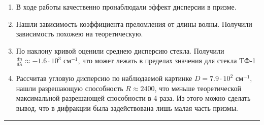 \documentclass[a4paper,12pt]{article} %
\begin{document}
\begin{enumerate}
\item В ходе работы	 качественно пронаблюдали эффект дисперсии в призме.
\item Нашли зависимость коэффициента преломления от длины волны. Получили зависимость похожею на теоретическую. 
\item По наклону кривой оценили среднею дисперсию стекла. Получили $\frac{dn}{d\lambda} \approx -1.6 \cdot 10^{3}$ см$^{-1}$, что может лежать в пределах значения для стекла TФ-1
\item Рассчитав угловую дисперсию по наблюдаемой картинке $D = 7.9 \cdot 10^2 $ см$^{-1}$, нашли разрешающую способность $R \approx 2400$, что меньше теоретической максимальной разрешающей способности в 4 раза. Из этого можно сделать вывод, что в дифракции была задействована лишь малая часть призмы.
\end{enumerate}



\medskip\hrule\medskip
\end{document}
